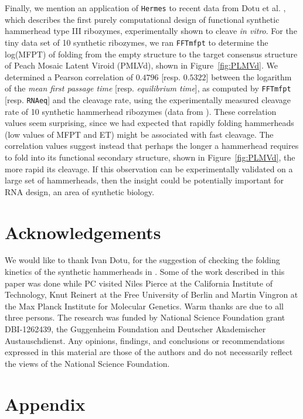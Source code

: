 Finally, we mention an application of {\tt Hermes} to recent data from
Dotu et al. \cite{syntheticHammerheads}, which describes the
first purely computational design of functional synthetic hammerhead type III
ribozymes, experimentally shown to cleave {\em in vitro}. For the tiny
data set of 10 synthetic ribozymes, we ran {\tt FFTmfpt} to determine the
log(MFPT) of folding from the empty structure to the target consensus
structure of Peach Mosaic Latent Viroid (PMLVd),
shown in Figure~\ref{fig:PLMVd}. We determined a
Pearson correlation of $0.4796$ [resp. $0.5322$]  between the logarithm of the
{\em mean first passage time} [resp. {\em equilibrium time}], as computed by
{\tt FFTmfpt} [resp. {\tt RNAeq}] and the cleavage rate, using the
experimentally measured cleavage rate of 10 synthetic hammerhead ribozymes
(data from \cite{syntheticHammerheads}).
These correlation values seem surprising, since we had expected that
rapidly folding hammerheads (low values of MFPT and ET) might be
associated with fast cleavage. The correlation values suggest instead
that perhaps the longer a hammerhead requires to fold into its functional
secondary structure, shown in Figure~\ref{fig:PLMVd}, the more rapid its
cleavage. If this observation can be experimentally validated on a large set
of hammerheads, then the insight could be potentially important for
RNA design, an area of synthetic biology.

\section{Acknowledgements}

We would like to thank Ivan Dotu, for the suggestion of checking the
folding kinetics of the synthetic hammerheads in \cite{syntheticHammerheads}.
Some of the work described in this paper was done while PC visited
Niles Pierce at the California Institute of Technology, Knut Reinert
at the Free University of Berlin and Martin Vingron at the Max Planck
Institute for Molecular Genetics. Warm thanks are due to all three
persons. The research was funded by National Science Foundation grant
DBI-1262439, the Guggenheim Foundation and Deutscher Akademischer
Austauschdienst. Any opinions, findings, and conclusions or
recommendations expressed in this material are those of the authors
and do not necessarily reflect the views of the National Science
Foundation.



\clearpage

\section*{Appendix}
\label{section:appendix}

